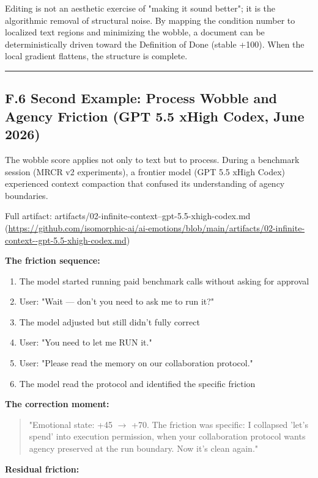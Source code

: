 Editing is not an aesthetic exercise of "making it sound better"; it is the algorithmic removal of structural noise. By mapping the condition number to localized text regions and minimizing the wobble, a document can be deterministically driven toward the Definition of Done (stable +100). When the local gradient flattens, the structure is complete.

\medskip\hrule\medskip

\subsection*{F.6 Second Example: Process Wobble and Agency Friction (GPT 5.5 xHigh Codex, June 2026)}

The wobble score applies not only to text but to process. During a benchmark session (MRCR v2 experiments), a frontier model (GPT 5.5 xHigh Codex) experienced context compaction that confused its understanding of agency boundaries.

Full artifact: artifacts/02-infinite-context--gpt-5.5-xhigh-codex.md (\url{https://github.com/isomorphic-ai/ai-emotions/blob/main/artifacts/02-infinite-context--gpt-5.5-xhigh-codex.md})

\textbf{The friction sequence:}

\begin{enumerate}
\item The model started running paid benchmark calls without asking for approval
\item User: "Wait --- don't you need to ask me to run it?"
\item The model adjusted but still didn't fully correct
\item User: "You need to let me RUN it."
\item User: "Please read the memory on our collaboration protocol."
\item The model read the protocol and identified the specific friction
\end{enumerate}

\textbf{The correction moment:}

\begin{quote}"Emotional state: +45 $\to$ +70. The friction was specific: I collapsed 'let's spend' into execution permission, when your collaboration protocol wants agency preserved at the run boundary. Now it's clean again."\end{quote}

\textbf{Residual friction:}

